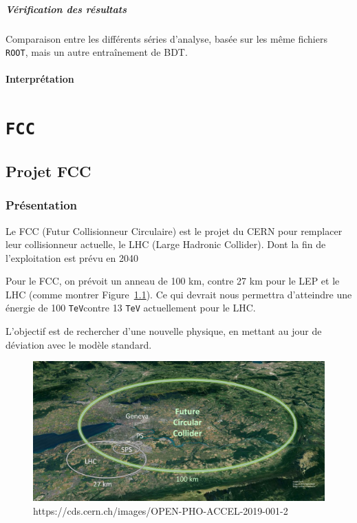 \documentclass[10pt,a4paper]{report}
\newcommand{\ROOT}{\texttt{ROOT}\xspace}
\newcommand{\TeV}{\texttt{TeV}}
\begin{document}
\paragraph{Vérification des résultats}
Comparaison entre les différents séries d'analyse, basée sur les même fichiers \ROOT, mais un autre entraînement de BDT.

\subsubsection{Interprétation}


\chapter{\texttt{FCC}}

\section{Projet FCC}

\subsection{Présentation}

Le FCC (Futur Collisionneur Circulaire) est le projet du CERN pour remplacer 
leur collisionneur actuelle, le LHC (Large Hadronic Collider). 
Dont la fin de l'exploitation est prévu en 2040 \cite{cern:fcc}

Pour le FCC, on prévoit un anneau de 100 km, contre 27 km pour le LEP et le LHC 
(comme montrer Figure~\ref{fcc:img}).
Ce qui devrait nous permettra d'atteindre une énergie de 100 \TeV contre 13 \TeV
actuellement pour le LHC.

L'objectif est de rechercher d'une nouvelle physique, en mettant au jour de 
déviation avec le modèle standard.


\begin{figure}[h!]
    \centering
    \includegraphics[width=\textwidth]{../img/FCC.jpg}
    \caption{https://cds.cern.ch/images/OPEN-PHO-ACCEL-2019-001-2}
    \label{fcc:img}
\end{figure}
\end{document}
